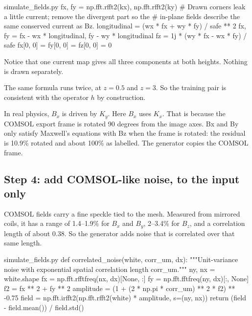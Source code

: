 \begin{code*}{simulate_fields.py}
    fx, fy = np.fft.rfft2(kx), np.fft.rfft2(ky)
    # Drawn corners leak a little current; remove the divergent part so the
    # in-plane fields describe the same conserved current as Bz.
    longitudinal = (wx * fx + wy * fy) / safe ** 2
    fx, fy = fx - wx * longitudinal, fy - wy * longitudinal
    fz = 1j * (wy * fx - wx * fy) / safe
    fx[0, 0] = fy[0, 0] = fz[0, 0] = 0
\end{code*}

Notice that one current map gives all three components at both heights. Nothing is drawn separately.

\begin{keyidea}
The same formula runs twice, at $z=0.5$ and $z=3$. So the training pair is consistent with the
operator $h$ by construction.
\end{keyidea}

\begin{careful}
In real physics, $B_x$ is driven by $K_y$. Here $B_x$ uses $K_x$. That is because the COMSOL
export frame is rotated 90 degrees from the image axes. Bx and By only satisfy Maxwell's
equations with Bz when the frame is rotated: the residual is 10.9\% rotated and about 100\% as
labelled. The generator copies the COMSOL frame.
\end{careful}

\subsection*{Step 4: add COMSOL-like noise, to the input only}

COMSOL fields carry a fine speckle tied to the mesh. Measured from mirrored coils, it has a range of
1.4--1.9\% for $B_x$ and $B_y$, 2--3.4\% for $B_z$, and a correlation length of about 0.38\um. So the
generator adds noise that is correlated over that same length.

\begin{code*}{simulate_fields.py}
def correlated_noise(white, corr_um, dx):
    """Unit-variance noise with exponential spatial correlation length corr_um."""
    ny, nx = white.shape
    fx = np.fft.rfftfreq(nx, dx)[None, :]
    fy = np.fft.fftfreq(ny, dx)[:, None]
    f2 = fx ** 2 + fy ** 2
    amplitude = (1 + (2 * np.pi * corr_um) ** 2 * f2) ** -0.75
    field = np.fft.irfft2(np.fft.rfft2(white) * amplitude, s=(ny, nx))
    return (field - field.mean()) / field.std()
\end{code*}

